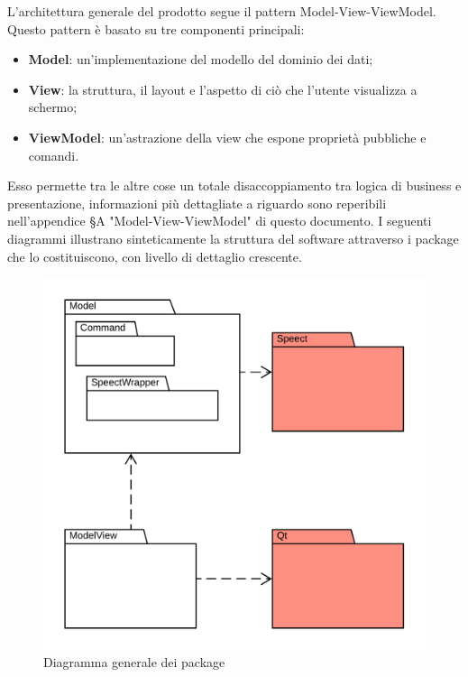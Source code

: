 \documentclass[openany,12pt,a4paper]{report}
\begin{document}
	L'architettura generale del prodotto segue il pattern Model-View-ViewModel. Questo pattern è basato su tre componenti principali:
	
	\begin{itemize}
		\item \textbf{Model}: un'implementazione del modello del dominio dei dati;
		\item \textbf{View}: la struttura, il layout e l'aspetto di ciò che l'utente visualizza a schermo;
		\item \textbf{ViewModel}: un'astrazione della view che espone proprietà pubbliche e comandi.
	\end{itemize}
	
	\noindent Esso permette tra le altre cose un totale disaccoppiamento tra logica di business e presentazione, informazioni più dettagliate a riguardo sono reperibili nell'appendice §A "Model-View-ViewModel" di questo documento. I seguenti diagrammi illustrano sinteticamente la struttura del software attraverso i package che lo costituiscono, con livello di dettaglio crescente.
	
	\newpage
	
	\begin{figure}[H]
		\includegraphics[scale=1.4]{PackageDiagram1}
		\centering
		\caption{Diagramma generale dei package}
	\end{figure}
	
\end{document}
